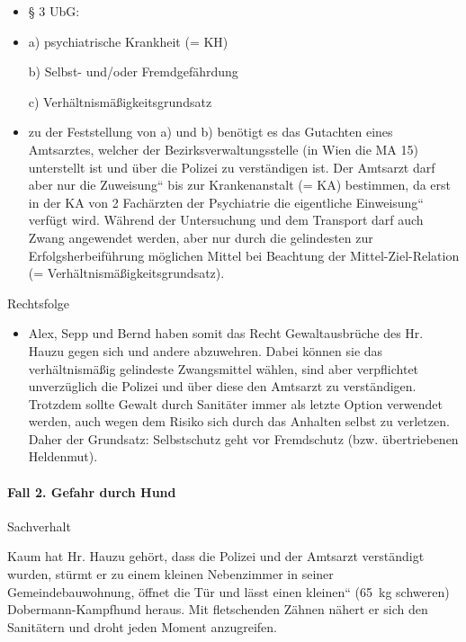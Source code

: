 \documentclass{article}
\begin{document}
\begin{itemize}
\item {\S} 3 UbG:

\end{itemize}
\begin{itemize}
\item[] a) psychiatrische Krankheit (= KH) 

b) Selbst- und/oder Fremdgef\"ahrdung

c) Verh\"altnism\"a{\ss}igkeitsgrundsatz

\end{itemize}
\begin{itemize}
\item[] zu der Feststellung von a) und b) ben\"otigt es das Gutachten
eines Amtsarztes, welcher der Bezirksverwaltungsstelle (in Wien die MA
15) unterstellt ist und \"uber die Polizei zu verst\"andigen ist. Der
Amtsarzt darf aber nur die {\quotedblbase}Zuweisung{\textquotedblleft}
bis zur Krankenanstalt (= KA) bestimmen, da erst in der KA von 2
Fach\"arzten der Psychiatrie die eigentliche
{\quotedblbase}Einweisung{\textquotedblleft} verf\"ugt wird. W\"ahrend
der Untersuchung und dem Transport darf auch Zwang angewendet werden,
aber nur durch die gelindesten zur Erfolgsherbeif\"uhrung m\"oglichen
Mittel bei Beachtung der Mittel-Ziel-Relation (= 
Verh\"altnism\"a{\ss}igkeitsgrundsatz).

\end{itemize}
Rechtsfolge

\begin{itemize}
\item Alex, Sepp und Bernd haben somit das Recht Gewaltausbr\"uche des
Hr. Hauzu gegen sich und andere abzuwehren. Dabei k\"onnen sie das
verh\"altnism\"a{\ss}ig gelindeste Zwangsmittel w\"ahlen, sind aber
verpflichtet unverz\"uglich die Polizei und \"uber diese den Amtsarzt
zu verst\"andigen. Trotzdem sollte Gewalt durch Sanit\"ater immer als
letzte Option verwendet werden, auch wegen dem Risiko sich durch das
Anhalten selbst zu verletzen. Daher der Grundsatz: Selbstschutz geht
vor Fremdschutz (bzw. \"ubertriebenen Heldenmut).

\end{itemize}
\paragraph{Fall 2. Gefahr durch Hund}
Sachverhalt

Kaum hat Hr. Hauzu geh\"ort, dass die Polizei und der Amtsarzt
verst\"andigt wurden, st\"urmt er zu einem kleinen Nebenzimmer in
seiner Gemeindebauwohnung, \"offnet die T\"ur und l\"asst einen
{\quotedblbase}kleinen{\textquotedblleft} (65~kg schweren)
Dobermann-Kampfhund heraus. Mit fletschenden Z\"ahnen n\"ahert er sich
den Sanit\"atern und droht jeden Moment anzugreifen.
\end{document}

